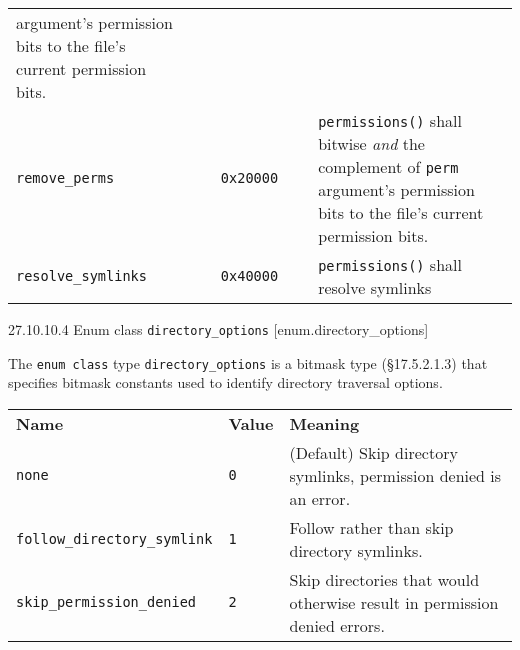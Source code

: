 \begin{longtable}[c]{@{}llll@{}}
\begin{minipage}[t]{0.22\columnwidth}
argument's permission bits to the file's current permission bits.
\strut\end{minipage}\tabularnewline
\begin{minipage}[t]{0.22\columnwidth}\raggedright\strut
\texttt{remove\_perms}
\strut\end{minipage} &
\begin{minipage}[t]{0.22\columnwidth}\raggedright\strut
\texttt{\ \ \ 0x20000}
\strut\end{minipage} &
\begin{minipage}[t]{0.22\columnwidth}\raggedright\strut
~
\strut\end{minipage} &
\begin{minipage}[t]{0.22\columnwidth}\raggedright\strut
\texttt{permissions()} shall bitwise \emph{and} the complement of
\texttt{perm} argument's permission bits to the file's current
permission bits.
\strut\end{minipage}\tabularnewline
\begin{minipage}[t]{0.22\columnwidth}\raggedright\strut
\texttt{resolve\_symlinks}
\strut\end{minipage} &
\begin{minipage}[t]{0.22\columnwidth}\raggedright\strut
\texttt{\ \ \ 0x40000}
\strut\end{minipage} &
\begin{minipage}[t]{0.22\columnwidth}\raggedright\strut
~
\strut\end{minipage} &
\begin{minipage}[t]{0.22\columnwidth}\raggedright\strut
\texttt{permissions()} shall resolve symlinks
\strut\end{minipage}\tabularnewline
\bottomrule
\end{longtable}

27.10.10.4 Enum class \texttt{directory\_options}
{[}enum.directory\_options{]}

The \texttt{enum\ class} type \texttt{directory\_options} is a bitmask
type (§17.5.2.1.3) that specifies bitmask constants used to identify
directory traversal options.

\begin{longtable}[c]{@{}lll@{}}
\toprule
\textbf{Name} & \textbf{Value} & \textbf{Meaning}\tabularnewline
\texttt{none} & \texttt{0} & (Default) Skip directory symlinks,
permission denied is an error.\tabularnewline
\texttt{follow\_directory\_symlink} & \texttt{1} & Follow rather than
skip directory symlinks.\tabularnewline
\texttt{skip\_permission\_denied} & \texttt{2} & Skip directories that
would otherwise result in permission denied errors.\tabularnewline
\bottomrule
\end{longtable}

